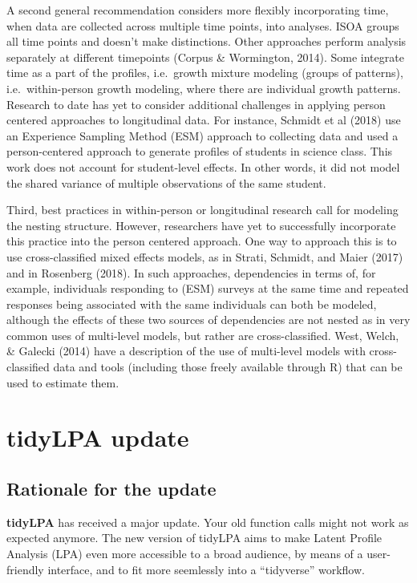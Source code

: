 \documentclass[man]{apa6}
\begin{document}
A second general recommendation considers more flexibly incorporating
time, when data are collected across multiple time points, into
analyses. ISOA groups all time points and doesn't make distinctions.
Other approaches perform analysis separately at different timepoints
(Corpus \& Wormington, 2014). Some integrate time as a part of the
profiles, i.e.~growth mixture modeling (groups of patterns),
i.e.~within-person growth modeling, where there are individual growth
patterns. Research to date has yet to consider additional challenges in
applying person centered approaches to longitudinal data. For instance,
Schmidt et al (2018) use an Experience Sampling Method (ESM) approach to
collecting data and used a person-centered approach to generate profiles
of students in science class. This work does not account for
student-level effects. In other words, it did not model the shared
variance of multiple observations of the same student.

Third, best practices in within-person or longitudinal research call for
modeling the nesting structure. However, researchers have yet to
successfully incorporate this practice into the person centered
approach. One way to approach this is to use cross-classified mixed
effects models, as in Strati, Schmidt, and Maier (2017) and in Rosenberg
(2018). In such approaches, dependencies in terms of, for example,
individuals responding to (ESM) surveys at the same time and repeated
responses being associated with the same individuals can both be
modeled, although the effects of these two sources of dependencies are
not nested as in very common uses of multi-level models, but rather are
cross-classified. West, Welch, \& Galecki (2014) have a description of
the use of multi-level models with cross-classified data and tools
(including those freely available through R) that can be used to
estimate them.

\section{tidyLPA update}\label{tidylpa-update}

\subsection{Rationale for the update}\label{rationale-for-the-update}

\textbf{tidyLPA} has received a major update. Your old function calls
might not work as expected anymore. The new version of tidyLPA aims to
make Latent Profile Analysis (LPA) even more accessible to a broad
audience, by means of a user-friendly interface, and to fit more
seemlessly into a \enquote{tidyverse} workflow.
\end{document}
